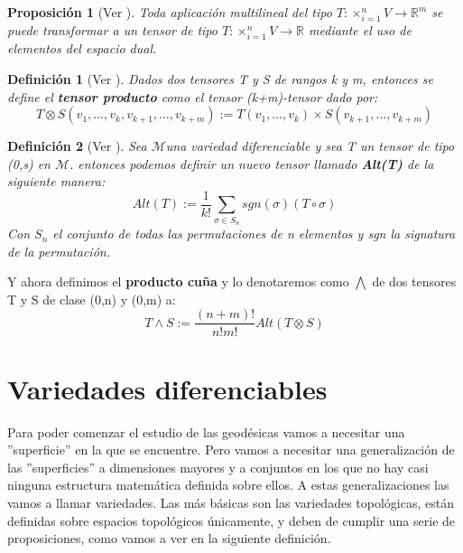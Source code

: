 \documentclass[pdftex,11pt,a4paper]{book}
\newtheorem{defi}{Definici\'on}
\newtheorem{propo}{Proposición}
\newcommand{\M}{$\mathscr{M}$}
\begin{document}
\begin{propo}[Ver \cite{chamizo}]
Toda aplicación multilineal del tipo $T:\times_{i=1}^nV \to \mathbb{R}^m
$ se puede transformar a un tensor de tipo  $T:\times_{i=1}^nV \to \mathbb{R}
$ mediante el uso de elementos del espacio dual.
\end{propo}

\begin{defi}[Ver \cite{gondinho}]
Dados dos tensores T y S de rangos k y m, entonces se define el \textbf{tensor producto} como el tensor (k+m)-tensor dado por: 
\begin{equation*}
    T\otimes S(v_1,\ldots,v_k,v_{k+1},\ldots, v_{k+m}):= T(v_1,\ldots,v_k)\times S(v_{k+1},\ldots, v_{k+m})
\end{equation*}\cite{gondinho}
\end{defi}

\begin{defi}[Ver \cite{gondinho}]
Sea \M una variedad diferenciable y sea T un tensor de tipo (0,s) en \M. entonces podemos definir un nuevo tensor llamado \textbf{Alt(T)}  de la siguiente manera:
\begin{equation*}
    Alt(T) :=\frac{1}{k!} \sum_{\sigma \in S_n} sgn(\sigma)(T\circ \sigma) 
\end{equation*}
Con $S_n$ el conjunto de todas las permutaciones de n elementos y \textit{sgn} la signatura de la permutación.
\end{defi}

Y ahora definimos el \textbf{producto cuña } y lo denotaremos como $\bigwedge$ de dos tensores T y S de clase (0,n) y (0,m) a: 
\begin{equation*}
    T \wedge  S := \frac{(n+m)!}{n! m!} Alt(T\otimes S)
\end{equation*}

\section{Variedades diferenciables}
Para poder comenzar el estudio de las geodésicas vamos a necesitar una ''superficie'' en la que se encuentre. Pero vamos a necesitar una generalización de las   ''superficies'' a dimensiones mayores y a conjuntos en los que no hay casi ninguna estructura matemática definida sobre ellos.
A estas generalizaciones las vamos a llamar variedades. Las más básicas son las variedades topológicas, están definidas sobre espacios topológicos únicamente, y deben de cumplir una serie de proposiciones, como vamos a ver en la siguiente definición.
\end{document}
